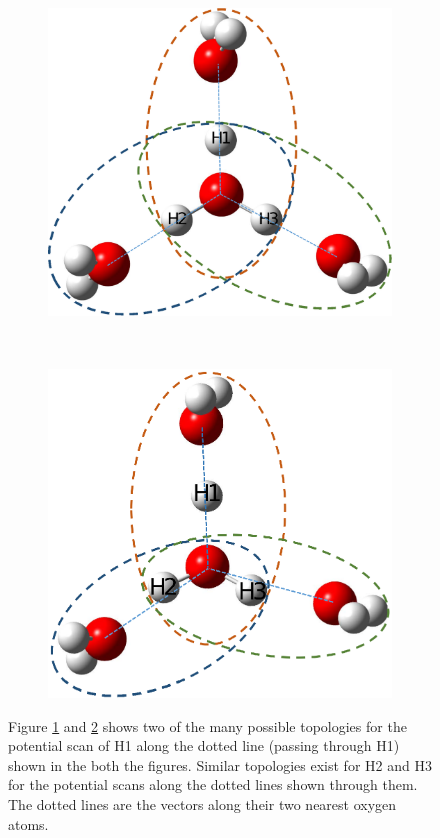 \begin{figure}[H]
    \centering
    \begin{subfigure}[t]{0.5\textwidth}
        \centering
        \includegraphics[width=1\textwidth]{figures/eigen1.eps}
        \caption{\label{eigenImage1}}
    \end{subfigure}%
    ~
    \begin{subfigure}[t]{0.5\textwidth}
        \centering
        \includegraphics[width=1\textwidth]{figures/eigen2.eps}
        \caption{\label{eigenImage2}}
    \end{subfigure}
    \caption{\label{eigenImage} Figure \ref{eigenImage1} and \ref{eigenImage2} shows two of the many possible
    topologies for the potential scan of H1 along the dotted line (passing through H1) shown in the both the
    figures. Similar topologies exist for H2 and H3 for the potential scans along the dotted lines shown
    through them. The dotted lines are the vectors along their two nearest oxygen atoms.}
\end{figure}


